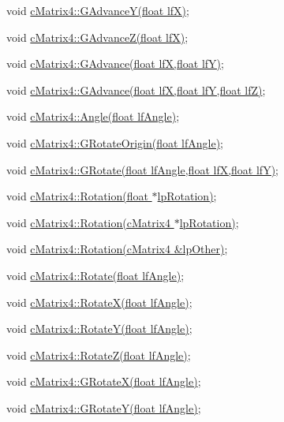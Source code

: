  void \hyperlink{classc_matrix4_af4453f95ef875b0c5002d72bade65bb1}{cMatrix4::GAdvanceY(float lfX)}; \par
 void \hyperlink{classc_matrix4_a0fd4e894762e73050e8e2e38acdfaf0d}{cMatrix4::GAdvanceZ(float lfX)}; \par
 void \hyperlink{classc_matrix4_a2dc12cbe708c7bc63ca2beff47c0c835}{cMatrix4::GAdvance(float lfX,float lfY)}; \par
 void \hyperlink{classc_matrix4_ac1c16ceb7ac4c2f771fc0d4662df643c}{cMatrix4::GAdvance(float lfX,float lfY,float lfZ)}; \par
 \par
 void \hyperlink{classc_matrix4_ac86eb165802e359a11ace5db20b73c72}{cMatrix4::Angle(float lfAngle)}; \par
 \par
 void \hyperlink{classc_matrix4_a04a196147274eb6b3d1aca1782c26091}{cMatrix4::GRotateOrigin(float lfAngle)}; \par
 void \hyperlink{classc_matrix4_a5115db44a0c51d97be3d5791fb19d18a}{cMatrix4::GRotate(float lfAngle,float lfX,float lfY)}; \par
 \par
 void \hyperlink{classc_matrix4_aeca3db3711d09781ec4ecf78a0423574}{cMatrix4::Rotation(float $\ast$lpRotation)}; \par
 void \hyperlink{classc_matrix4_a2777b2361f3656d4f8c1413456ea22d2}{cMatrix4::Rotation(cMatrix4 $\ast$lpRotation)}; \par
 void \hyperlink{classc_matrix4_aa3eadfc363f0d3696e8f9468ccd3782b}{cMatrix4::Rotation(cMatrix4 \&lpOther)}; \par
 \par
 void \hyperlink{classc_matrix4_ab21d0553250b8ca4b0388105afc79478}{cMatrix4::Rotate(float lfAngle)}; \par
 void \hyperlink{classc_matrix4_af3c238c3d65276912b3071c33c9a8e59}{cMatrix4::RotateX(float lfAngle)}; \par
 void \hyperlink{classc_matrix4_ac625c531c3644462cc91ed53bef5e1e9}{cMatrix4::RotateY(float lfAngle)}; \par
 void \hyperlink{classc_matrix4_a784f4dd7106e393b654d17ff78cc49a7}{cMatrix4::RotateZ(float lfAngle)}; \par
 \par
 void \hyperlink{classc_matrix4_a0be08400d130f819bbedbb35f551d4c7}{cMatrix4::GRotateX(float lfAngle)}; \par
 void \hyperlink{classc_matrix4_a0ae1a3c85f3b00127217b67c7d75a7cc}{cMatrix4::GRotateY(float lfAngle)}; \par

